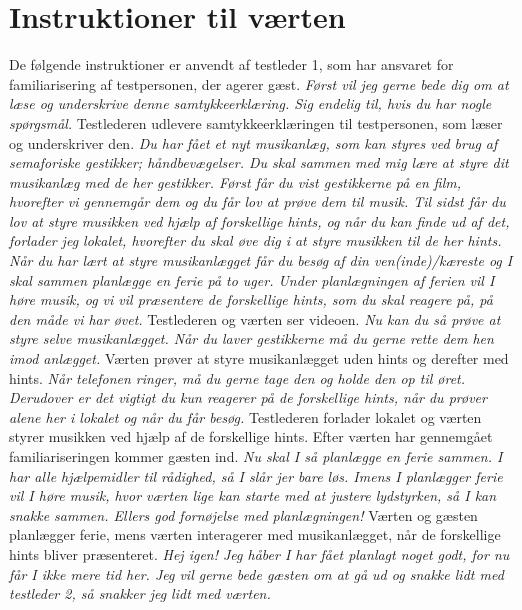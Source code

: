 \chapter{Instruktioner til værten}
\label{app:InstruktionerVaert}
%
De følgende instruktioner er anvendt af testleder 1, som har ansvaret for familiarisering af testpersonen, der agerer gæst. \blankline
%
\textit{Først vil jeg gerne bede dig om at læse og underskrive denne samtykkeerklæring. Sig endelig til, hvis du har nogle spørgsmål.}\blankline
%
Testlederen udlevere samtykkeerklæringen til testpersonen, som læser og underskriver den. \blankline
%
\textit{Du har fået et nyt musikanlæg, som kan styres ved brug af semaforiske gestikker; håndbevægelser. Du skal sammen med mig lære at styre dit musikanlæg med de her gestikker. Først får du vist gestikkerne på en film, hvorefter vi gennemgår dem og du får lov at prøve dem til musik. Til sidst får du lov at styre musikken ved hjælp af forskellige hints, og når du kan finde ud af det, forlader jeg lokalet, hvorefter du skal øve dig i at styre musikken til de her hints. Når du har lært at styre musikanlægget får du besøg af din ven(inde)/kæreste og I skal sammen planlægge en ferie på to uger. Under planlægningen af ferien vil I høre musik, og vi vil præsentere de forskellige hints, som du skal reagere på, på den måde vi har øvet.}\blankline
%
Testlederen og værten ser videoen.\blankline
%
\textit{Nu kan du så prøve at styre selve musikanlægget. Når du laver gestikkerne må du gerne rette dem hen imod anlægget.}\blankline
%
Værten prøver at styre musikanlægget uden hints og derefter med hints. \blankline
%
\textit{Når telefonen ringer, må du gerne tage den og holde den op til øret. Derudover er det vigtigt du kun reagerer på de forskellige hints, når du prøver alene her i lokalet og når du får besøg.}\blankline
%
Testlederen forlader lokalet og værten styrer musikken ved hjælp af de forskellige hints. Efter værten har gennemgået familiariseringen kommer gæsten ind. \blankline
%
\textit{Nu skal I så planlægge en ferie sammen. I har alle hjælpemidler til rådighed, så I slår jer bare løs. Imens I planlægger ferie vil I høre musik, hvor værten lige kan starte med at justere lydstyrken, så I kan snakke sammen. Ellers god fornøjelse med planlægningen!}\blankline
%
Værten og gæsten planlægger ferie, mens værten interagerer med musikanlægget, når de forskellige hints bliver præsenteret.\blankline
%
\textit{Hej igen! Jeg håber I har fået planlagt noget godt, for nu får I ikke mere tid her. Jeg vil gerne bede gæsten om at gå ud og snakke lidt med testleder 2, så snakker jeg lidt med værten.}
